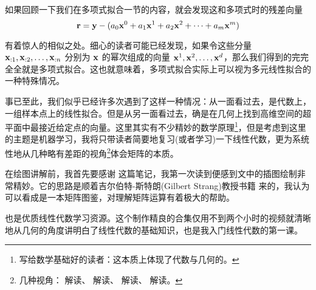 如果回顾一下我们在多项式拟合一节的内容，就会发现这和多项式时的残差向量
\[
    {\mathbf{r}} = {\mathbf{y}} - (a_0 {\mathbf{x}}^0 + a_1 {\mathbf{x}}^1 + a_2 {\mathbf{x}}^2 + \cdots + a_{m} {\mathbf{x}}^{m})
\]

有着惊人的相似之处。细心的读者可能已经发现，如果令这些分量 ${\mathbf{x}}_{:1}, {\mathbf{x}}_{:2}, \ldots, {\mathbf{x}}_{:n}$ 分别为 ${\mathbf{x}}$ 的幂次组成的向量 ${\mathbf{x}}^1, {\mathbf{x}}^2, \ldots, {\mathbf{x}}^d$，那么我们得到的完完全全就是多项式拟合。这也就意味着，多项式拟合实际上可以视为多元线性拟合的一种特殊情况。

事已至此，我们似乎已经许多次遇到了这样一种情况：从一面看过去，是代数上，一组样本点上的线性拟合。但是从另一面看过去，确是在几何上找到高维空间的超平面中最接近给定点的向量。这里其实有不少精妙的数学原理\footnote{写给数学基础好的读者：这本质上体现了代数与几何的。}，但是考虑到这里的主题是机器学习，我将只带读者简要地复习(或者学习)一下线性代数，更为系统性地从几种略有差距的视角\footnote{
    几种视角：
    解读、
    解读、
    解读、
    解读。
}体会矩阵的本质。

在绘图讲解前，我首先要感谢 这篇笔记，我第一次读到便感到文中的插图绘制非常精妙。它的思路是顺着吉尔伯特-斯特朗(Gilbert Strang)教授书籍 来的，我认为可以看成是一本矩阵图鉴，对理解矩阵运算有着极大的帮助。

也是优质线性代数学习资源。这个制作精良的合集仅用不到两个小时的视频就清晰地从几何的角度讲明白了线性代数的基础知识，也是我入门线性代数的第一课。

